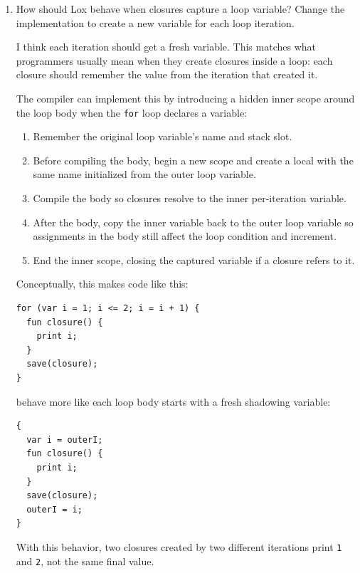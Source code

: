 \documentclass{article}
\begin{document}
\begin{enumerate}
    \item {
        How should Lox behave when closures capture a loop variable? Change the
        implementation to create a new variable for each loop iteration.

        I think each iteration should get a fresh variable. This matches what
        programmers usually mean when they create closures inside a loop: each closure
        should remember the value from the iteration that created it.

        The compiler can implement this by introducing a hidden inner scope around the
        loop body when the \texttt{for} loop declares a variable:

        \begin{enumerate}
            \item Remember the original loop variable's name and stack slot.
            \item Before compiling the body, begin a new scope and create a local with
            the same name initialized from the outer loop variable.
            \item Compile the body so closures resolve to the inner per-iteration
            variable.
            \item After the body, copy the inner variable back to the outer loop
            variable so assignments in the body still affect the loop condition and
            increment.
            \item End the inner scope, closing the captured variable if a closure
            refers to it.
        \end{enumerate}

        Conceptually, this makes code like this:

        \begin{verbatim}
for (var i = 1; i <= 2; i = i + 1) {
  fun closure() {
    print i;
  }
  save(closure);
}
        \end{verbatim}

        behave more like each loop body starts with a fresh shadowing variable:

        \begin{verbatim}
{
  var i = outerI;
  fun closure() {
    print i;
  }
  save(closure);
  outerI = i;
}
        \end{verbatim}

        With this behavior, two closures created by two different iterations print
        \texttt{1} and \texttt{2}, not the same final value.
    }


\end{enumerate}
\end{document}
